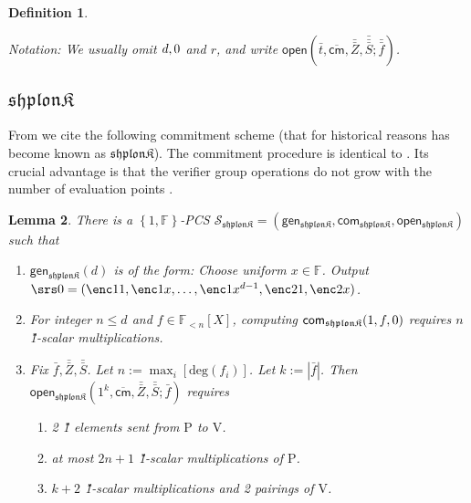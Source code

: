 \documentclass[11pt]{article} %
\newcommand{\F}{\ensuremath{\mathbb F}\xspace}
\newcommand{\cmm}{\ensuremath{\mathsf{\overline{cm}}}\xspace}
\newcommand{\open}{\ensuremath{\mathsf{open}}\xspace}
\renewcommand{\deg}{\ensuremath{\mathrm{deg}}\xspace}
\newcommand{\defeq}{:=}
\newcommand{\prvpc}{\ensuremath{\mathrm{P}}\xspace}%
\newcommand{\verpc}{\ensuremath{\mathrm{V}}\xspace}%
\newcommand{\shplonk}{\ensuremath{\mathfrak{sh}\mathfrak{p}\mathfrak{lon}\mathfrak{K}}\xspace}
\newcommand{\set}[1]{\ensuremath{\left\{#1\right\}}\xspace}
\newcommand{\polysofdeg}[1]{\ensuremath{\F_{< #1}[X]}\xspace}
\newtheorem{lemma}{Lemma}[section]
\newtheorem{dfn}[lemma]{Definition}
\newcommand{\Z}{\mathbb{Z}}
\newcommand{\f}{\ensuremath{\bar{f}}\xspace}
\renewcommand{\t}{\ensuremath{\bar{t}}\xspace}
\newcommand{\ff}{\ensuremath{\bar{\bar{f}}}\xspace}
\renewcommand{\Z}{\ensuremath{\bar{Z}}\xspace}
\newcommand{\ZZ}{\ensuremath{\bar{\bar{Z}}}\xspace}
\renewcommand{\SS}{\ensuremath{\bar{\bar{S}}}\xspace}
\newcommand{\SSS}{\ensuremath{\bar{\bar{\bar{S}}}}\xspace}
\newcommand{\openshplonk}{\ensuremath{\mathsf{open_{\shplonk}}}\xspace}
\newcommand{\PCschemeshplonk}{\ensuremath{\mathscr{S_{\shplonk}}}\xspace}
\newcommand{\genshplonk}{\ensuremath{\mathsf{gen_{\shplonk}}}\xspace}
\newcommand{\comshplonk}{\ensuremath{\mathsf{com_{\shplonk}}}\xspace}
\begin{document}
\begin{dfn}
\begin{itemize}
\begin{itemize}
\begin{enumerate}
 \end{enumerate}

\end{itemize}
\end{itemize}
\textit{Notation:} We usually omit $d,\srs0$ and $r$, and write $\open(\t,\cmm,\ZZ,\SSS;\ff)$.
\end{dfn}

\subsection{\shplonk}
From \cite{shplonk} we cite the following commitment scheme (that for historical reasons has become known as \shplonk). The commitment procedure is identical to \cite{kate}. Its crucial advantage is that the verifier group operations do not grow with the number of evaluation points .
\begin{lemma}\label{lem:shplonk}
There is a $\set{1,\F}$-PCS $\PCschemeshplonk=(\genshplonk,\comshplonk,\openshplonk)$ such that
  \begin{enumerate}
  \item $\genshplonk(d)$ is of the form: Choose uniform $x\in \F$. Output $\srs0 =(\enc1{1},\enc1{x},\ldots,\enc1{x^{d-1}},\enc2{1},\enc2{x})$.
  \item For integer $n\leq d$ and $f\in \polysofdeg{n}$, computing $\comshplonk(1,f,\srs0)$ requires $n$ \G1-scalar multiplications.
   \item Fix $\f,\ZZ,\SS$. Let $n\defeq \max_{i} \left[\deg(f_{i})\right]$. Let $k\defeq |\f|$.
   Then $\openshplonk\left(1^k,\cmm,\ZZ,\SS;\f\right)$ requires

    \begin{enumerate}
    \item 2 \G1 elements sent from \prvpc to \verpc.
    \item at most $2n+1$ \G1-scalar multiplications of \prvpc.
    \item $k+2$ \G1-scalar multiplications and 2 pairings of \verpc.
\end{enumerate}
\end{enumerate}
\end{lemma}
\end{document}
